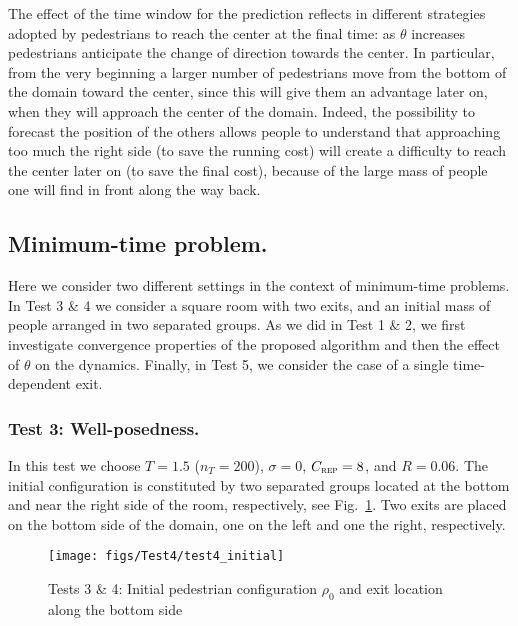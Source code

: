 \documentclass{cmslatex}
\renewcommand{\r}{\rho}
\begin{document}
The effect of the time window for the prediction reflects in different strategies adopted by pedestrians to reach the center at the final time:
as $\theta$ increases pedestrians anticipate the change of direction towards the center. In particular, from the very beginning a larger number of pedestrians move from the bottom of the domain toward the center, since this will give them an advantage later on, when they will approach the center of the domain.
Indeed, the possibility to forecast the position of the others allows people to understand that approaching too much the right side (to save the running cost) will create a difficulty to reach the center later on (to save the final cost), because of the large mass of people one will find in front along the way back. 


\subsection{Minimum-time problem.}
Here we consider two different settings in the context of minimum-time problems. 
In Test 3 \& 4 we consider a square room with two exits, and an initial mass of people arranged in two separated groups. As we did in Test 1 \& 2, we first investigate convergence properties of the proposed  algorithm and then the effect of $\theta$ on the dynamics.
Finally, in Test 5, we consider the case of a single time-dependent exit.

\subsubsection{Test 3: Well-posedness.}
In this test we choose $T=1.5$ ($n_T=200$), $\sigma=0$, $C_\textsc{rep}=8$, and $R=0.06$. 
The initial configuration is constituted by two separated groups located at the bottom and near the right side of the room, respectively, see Fig.\ \ref{fig:test4_initial}. 
Two exits are placed on the bottom side of the domain, one on the left and one the right, respectively.
%
\begin{figure}[h!]
\centering
\texttt{[image: figs/Test4/test4\_initial]}
\caption{Tests 3 \& 4: Initial pedestrian configuration $\r_0$ and exit location along the bottom side}
\label{fig:test4_initial}
\end{figure}
\end{document}
